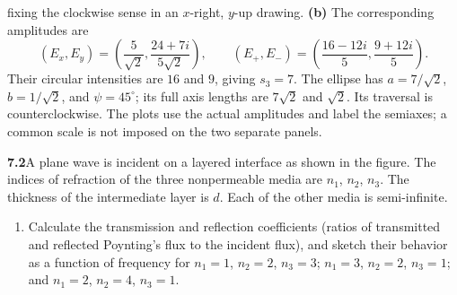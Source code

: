 fixing the clockwise sense in an $x$-right, $y$-up drawing.
\textbf{(b)} The corresponding amplitudes are
\[
\boxed{(E_x,E_y)=\left(\frac5{\sqrt2},\frac{24+7i}{5\sqrt2}\right),
\qquad(E_+,E_-)=\left(\frac{16-12i}{5},\frac{9+12i}{5}\right).}
\]
Their circular intensities are $16$ and $9$, giving $s_3=7$.
The ellipse has $a=7/\sqrt2$, $b=1/\sqrt2$, and $\psi=45^\circ$;
its full axis lengths are $7\sqrt2$ and $\sqrt2$. Its traversal is
counterclockwise. The plots use the actual amplitudes and label the
semiaxes; a common scale is not imposed on the two separate panels.
\begin{center}

\end{center}

\par\bigskip
\noindent\textbf{7.2}\quad A plane wave is incident on a layered interface as shown in the figure. The indices of refraction of the three nonpermeable media are $n_{1}$, $n_{2}$, $n_{3}$. The thickness of the intermediate layer is $d$. Each of the other media is semi-infinite.
\begin{enumerate}
\item[(a)] Calculate the transmission and reflection coefficients (ratios of transmitted and reflected Poynting's flux to the incident flux), and sketch their behavior as a function of frequency for $n_{1}=1$, $n_{2}=2$, $n_{3}=3$; $n_{1}=3$, $n_{2}=2$, $n_{3}=1$; and $n_{1}=2$, $n_{2}=4$, $n_{3}=1$.
\end{enumerate}

\begin{center}
\end{center}

